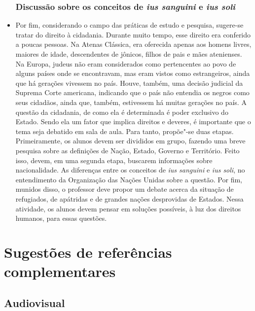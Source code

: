 \documentclass[12pt]{extarticle}
\begin{document}
\begin{itemize}


\subsubsection{Discussão sobre os conceitos de \emph{ius sanguini} e \emph{ius soli}}

\item Por fim, considerando o campo das práticas de estudo e pesquisa,
sugere-se tratar do direito à cidadania.
Durante muito tempo, esse direito era conferido a poucas
pessoas. Na Atenas Clássica, era oferecida apenas aos homens livres,
maiores de idade, descendentes de jônicos, filhos de pais e mães
atenienses. Na Europa, judeus não eram considerados como pertencentes
ao povo de alguns países onde se encontravam, mas eram vistos como
estrangeiros, ainda que há gerações vivessem no país. Houve, também,
uma decisão judicial da Suprema Corte americana, indicando que o país
não entendia os negros como seus cidadãos, ainda que, também,
estivessem há muitas gerações no país. A questão da cidadania, de como
ela é determinada é poder exclusivo do Estado. Sendo ela um fator que
implica direitos e deveres, é importante que o tema seja debatido em
sala de aula. Para tanto, propõe"-se duas etapas. Primeiramente, os
alunos devem ser divididos em grupo, fazendo uma breve pesquisa sobre
as definições de Nação, Estado, Governo e Território. Feito isso,
devem, em uma segunda etapa, buscarem informações sobre nacionalidade.
As diferenças entre os conceitos de \emph{ius sanguini} e \emph{ius
soli}, no entendimento da Organização das Nações Unidas sobre a
questão. Por fim, munidos disso, o professor deve propor um debate
acerca da situação de refugiados, de apátridas e de grandes nações
desprovidas de Estados. Nessa atividade, os alunos devem pensar em
soluções possíveis, à luz dos direitos humanos, para essas questões.

\end{itemize}

\section{Sugestões de referências complementares}\label{sugestoes}

\subsection{Audiovisual}
\end{document}
